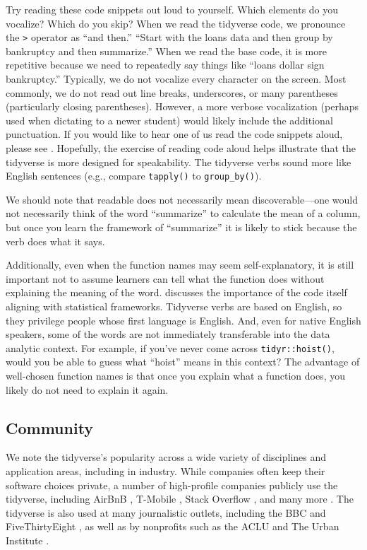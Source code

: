 \documentclass[12pt]{article}
\begin{document}
Try reading these code snippets out loud to yourself. Which elements do
you vocalize? Which do you skip? When we read the tidyverse code, we
pronounce the \texttt{\textbar{}\textgreater{}} operator as ``and
then.'' ``Start with the loans data and then group by bankruptcy and
then summarize.'' When we read the base code, it is more repetitive
because we need to repeatedly say things like ``loans dollar sign
bankruptcy.'' Typically, we do not vocalize every character on the
screen. Most commonly, we do not read out line breaks, underscores, or
many parentheses (particularly closing parentheses). However, a more
verbose vocalization (perhaps used when dictating to a newer student)
would likely include the additional punctuation. If you would like to
hear one of us read the code snippets aloud, please see
\citet{mcnamara2021}. Hopefully, the exercise of reading code aloud
helps illustrate that the tidyverse is more designed for speakability.
The tidyverse verbs sound more like English sentences (e.g., compare
\texttt{tapply()} to \texttt{group\_by()}).

We should note that readable does not necessarily mean
discoverable---one would not necessarily think of the word ``summarize''
to calculate the mean of a column, but once you learn the framework of
``summarize'' it is likely to stick because the verb does what it says.

Additionally, even when the function names may seem self-explanatory, it
is still important not to assume learners can tell what the function
does without explaining the meaning of the word. \citet{thoma2021}
discusses the importance of the code itself aligning with statistical
frameworks. Tidyverse verbs are based on English, so they privilege
people whose first language is English. And, even for native English
speakers, some of the words are not immediately transferable into the
data analytic context. For example, if you've never come across
\texttt{tidyr::hoist()}, would you be able to guess what ``hoist'' means
in this context? The advantage of well-chosen function names is that
once you explain what a function does, you likely do not need to explain
it again.

\hypertarget{sec:community}{%
\subsection{Community}\label{sec:community}}

We note the tidyverse's popularity across a wide variety of disciplines
and application areas, including in industry. While companies often keep
their software choices private, a number of high-profile companies
publicly use the tidyverse, including AirBnB \citep{bion_how_2018},
T-Mobile \citep{nolis_were_2020}, Stack Overflow
\citep{robinson_exploring_2015}, and many more
\citep{rstudio_pbc_rstudio_nodate}. The tidyverse is also used at many
journalistic outlets, including the BBC
\citep{bbc_visual_and_data_journalism_how_2019} and FiveThirtyEight
\citep{flowers_fivethirtyeights_2016}, as well as by nonprofits such as
the ACLU \citep{watson_r_2019} and The Urban Institute
\citep{dataurban_building_2019}.
\end{document}
